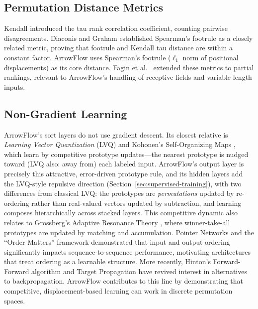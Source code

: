 \documentclass[12pt]{article}
\begin{document}
\subsection{Permutation Distance Metrics}
Kendall \citep{kendall1938} introduced the tau rank correlation coefficient, counting pairwise disagreements. Diaconis and Graham \citep{diaconis1977footrule} established Spearman's footrule as a closely related metric, proving that footrule and Kendall tau distance are within a constant factor. ArrowFlow uses Spearman's footrule ($\ell_1$ norm of positional displacements) as its core distance. Fagin et al.\ \citep{fagin2003topk} extended these metrics to partial rankings, relevant to ArrowFlow's handling of receptive fields and variable-length inputs.

\subsection{Non-Gradient Learning}
ArrowFlow's sort layers do not use gradient descent. Its closest relative is \emph{Learning Vector Quantization} (LVQ) and Kohonen's Self-Organizing Maps \citep{kohonen1990self}, which learn by competitive prototype updates---the nearest prototype is nudged toward (LVQ also: away from) each labeled input. ArrowFlow's output layer is precisely this attractive, error-driven prototype rule, and its hidden layers add the LVQ-style repulsive direction (Section~\ref{sec:supervised-training}), with two differences from classical LVQ: the prototypes are \emph{permutations} updated by re-ordering rather than real-valued vectors updated by subtraction, and learning composes hierarchically across stacked layers. This competitive dynamic also relates to Grossberg's Adaptive Resonance Theory \citep{grossberg1987competitive}, where winner-take-all prototypes are updated by matching and accumulation. Pointer Networks \citep{vinyals2015pointernetworks} and the ``Order Matters'' framework \citep{vinyals2015order} demonstrated that input and output ordering significantly impacts sequence-to-sequence performance, motivating architectures that treat ordering as a learnable structure. More recently, Hinton's Forward-Forward algorithm \citep{hinton2022forward} and Target Propagation \citep{lee2015difference} have revived interest in alternatives to backpropagation. ArrowFlow contributes to this line by demonstrating that competitive, displacement-based learning can work in discrete permutation spaces.
\end{document}
